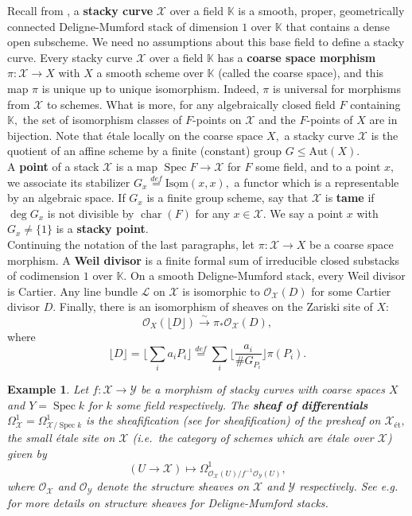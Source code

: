 \documentclass[11pt]{amsart}
\newtheorem{example}[theorem]{Example}
\theoremstyle{definition}
\numberwithin{equation}{section}
\newcommand{\Isom}{\mathrm{Isom}} 	%
\newcommand{\Aut}{\mathrm{Aut}} 	%
\newcommand{\Spec}{\operatorname{Spec}} 	%
\newcommand{\cO}{\mathcal{O}}		%
\newcommand{\sL}{\mathscr{L}}		%
\newcommand{\sX}{\mathscr{X}}		%
\newcommand{\sY}{\mathscr{Y}}		%
\newcommand{\bbK}{\mathbb{K}}		%
\begin{document}
		Recall from \cite[Sections $5.2$ and $5.3$]{VZB}, a \textbf{stacky curve} $\sX$ over a field $\bbK$ is a smooth, proper, geometrically connected Deligne-Mumford stack of dimension $1$ over $\bbK$ that contains a dense open subscheme. We need no assumptions about this base field to define a stacky curve. Every stacky curve $\sX$ over a field $\bbK$ has a \textbf{coarse space morphism} $\pi:\sX\to X$ with $X$ a smooth scheme over $\bbK$ (called the coarse space), and this map $\pi$ is unique up to unique isomorphism. Indeed, $\pi$ is universal for morphisms from $\sX$ to schemes. What is more, for any algebraically closed field $F$ containing $\bbK,$ the set of isomorphism classes of $F$-points on $\sX$ and the $F$-points of $X$ are in bijection. Note that \'etale locally on the coarse space $X,$ a stacky curve $\sX$ is the quotient of an affine scheme by a finite (constant) group $G\leq \Aut(X).$\\
		
		A \textbf{point} of a stack $\sX$ is a map $\Spec F\to \sX$ for $F$ some field, and to a point $x,$ we associate its stabilizer $G_x\overset{def}{=}\underline{\Isom}(x,x),$ a functor which is a representable by an algebraic space. If $G_x$ is a finite group scheme, say that $\sX$ is \textbf{tame} if $\deg G_x$ is not divisible by $\operatorname{char}(F)$ for any $x\in \sX.$ We say a point $x$ with $G_x\neq \{1\}$ is a \textbf{stacky point}.\\
		
		Continuing the notation of the last paragraphs, let $\pi:\sX\to X$ be a coarse space morphism. A \textbf{Weil divisor} is a finite formal sum of irreducible closed substacks of codimension $1$ over $\bbK.$ On a smooth Deligne-Mumford stack, every Weil divisor is Cartier. Any line bundle $\sL$ on $\sX$ is isomorphic to $\cO_{\sX}(D)$ for some Cartier divisor $D.$ Finally, there is an isomorphism of sheaves on the Zariski site of $X:$
		\[ \cO_X(\lfloor D \rfloor)\overset{\sim}{\to}\pi_*\cO_{\sX}(D), \]
		where \[\lfloor D\rfloor=\Big\lfloor\sum_ia_iP_i\Big\rfloor\overset{def}{=}\sum_i\Big\lfloor\frac{a_i}{\#G_{P_i}}\Big\rfloor\pi(P_i).\]
		
		\begin{example}\label{ex: sheaf of differentials}
			Let $f:\sX\to \sY$ be a morphism of stacky curves with coarse spaces $X$ and $Y=\Spec k$ for $k$ some field respectively. The \textbf{sheaf of differentials} $\Omega^1_{\sX}=\Omega^1_{\sX/\Spec k}$ is the sheafification (see \cite[Section $2.2.3$]{Alper-Stacks-and-Moduli} for sheafification) of the presheaf on $\sX_{\text{\'et}},$ the small \'etale site on $\sX$ (i.e.\ the category of schemes which are \'etale over $\sX$) given by 
			\[ (U\to \sX)\mapsto \Omega^1_{\cO_{\sX}(U)/f^{-1}\cO_{\sY}(U)},\]
			where $\cO_{\sX}$ and $\cO_{\sY}$ denote the structure sheaves on $\sX$ and $\sY$ respectively. See e.g.\ \cite[Example $4.1.2$]{Alper-Stacks-and-Moduli} for more details on structure sheaves for Deligne-Mumford stacks. 
		\end{example}
		
\end{document}
